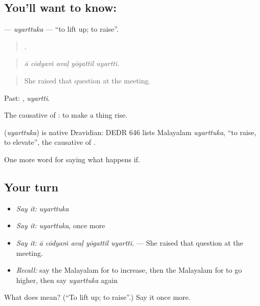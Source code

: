 \subsection*{You'll want to know: }
\textbf{} — \emph{uyarttuka} — \textquotedblleft{}to lift up; to raise\textquotedblright{}.

\begin{quote}
    .
\end{quote}

\begin{quote}
\emph{ā cōdyaṁ avaḷ yōgattil uyartti.}
\end{quote}

\begin{quote}
She raised that question at the meeting.
\end{quote}

Past: , \emph{uyartti}.

The causative of : to make a thing rise.

\begin{cousinweb}
\textbf{} (\emph{uyarttuka}) is native Dravidian: DEDR 646 lists Malayalam \emph{uyarttuka}, \textquotedblleft{}to raise, to elevate\textquotedblright{}, the causative of .
\end{cousinweb}

\begin{grammarlens}[title={What you've built}]
One more word for saying what happens if.
\end{grammarlens}

\subsection*{Your turn}
\begin{itemize}
\raggedright
  \item \emph{Say it:} \emph{uyarttuka}
  \item \emph{Say it:} \emph{uyarttuka}, once more
  \item \emph{Say it:} \emph{ā cōdyaṁ avaḷ yōgattil uyartti.} — She raised that question at the meeting.
  \item \emph{Recall:} say the Malayalam for to increase, then the Malayalam for to go higher, then say \emph{uyarttuka} again
\end{itemize}

\begin{tcolorbox}[breakable,colback=teal!4,colframe=teal!35!black,title={Before you move on}]
What does  mean? (\textquotedblleft{}To lift up; to raise\textquotedblright{}.) Say it once more.
\end{tcolorbox}
